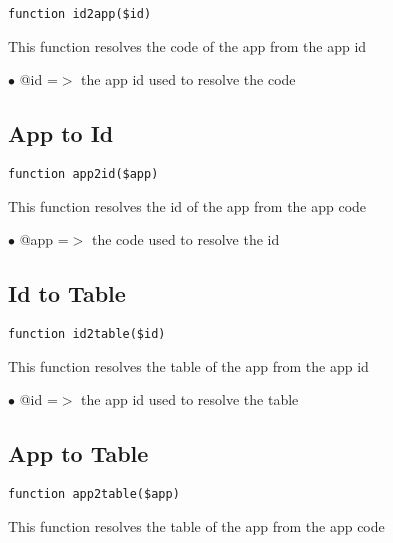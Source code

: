 \documentclass[a4paper]{book}
\begin{document}
\begin{lstlisting}
function id2app($id)
\end{lstlisting}

This function resolves the code of the app from the app id

\begin{compactitem}
\item[\color{myblue}$\bullet$] @id =$>$ the app id used to resolve the code
\end{compactitem}

\hypertarget{toc22}{}
\subsection{App to Id}

\begin{lstlisting}
function app2id($app)
\end{lstlisting}

This function resolves the id of the app from the app code

\begin{compactitem}
\item[\color{myblue}$\bullet$] @app =$>$ the code used to resolve the id
\end{compactitem}

\hypertarget{toc23}{}
\subsection{Id to Table}

\begin{lstlisting}
function id2table($id)
\end{lstlisting}

This function resolves the table of the app from the app id

\begin{compactitem}
\item[\color{myblue}$\bullet$] @id =$>$ the app id used to resolve the table
\end{compactitem}

\hypertarget{toc24}{}
\subsection{App to Table}

\begin{lstlisting}
function app2table($app)
\end{lstlisting}

This function resolves the table of the app from the app code
\end{document}
